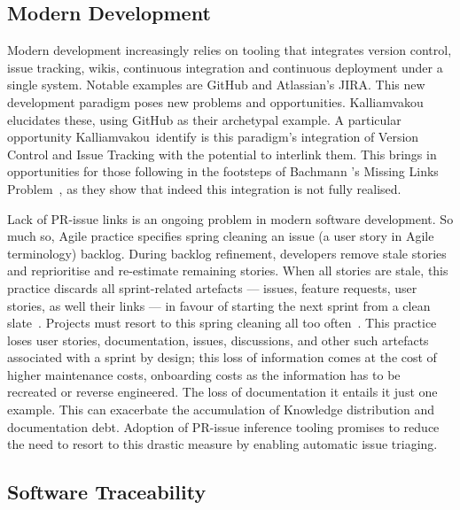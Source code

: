 \subsection{Modern Development}
\label{chapter:literature:sec:am_rel_work:modern_dev}

Modern development increasingly relies on tooling that integrates version
control, issue tracking, wikis, continuous integration and continuous deployment
under a single system. Notable examples are GitHub and Atlassian's JIRA. This
new development paradigm poses new problems and opportunities. Kalliamvakou
\etal~\cite{Kalliamvakou2014} elucidates these, using GitHub as their archetypal
example. A particular opportunity Kalliamvakou~\etal identify is this paradigm's
integration of Version Control and Issue Tracking with the potential to
interlink them. This brings in opportunities for those following in the
footsteps of Bachmann \etal's Missing Links Problem~\cite{MissingLinks}, as they
show that indeed this integration is not fully realised.

Lack of PR-issue links is an ongoing problem in modern software development.  So
much so, Agile practice specifies spring cleaning an issue (a user story in
Agile terminology) backlog. During backlog refinement, developers remove stale
stories and reprioritise and re-estimate remaining stories. When all stories are
stale, this practice discards all sprint-related artefacts --- issues, feature
requests, user stories, as well their links --- in favour of starting the next
sprint from a clean slate~\cite{BacklogRefinement}. Projects must resort to this
spring cleaning all too often~\cite{laurieTrattPersonalCommunciation}. This
practice loses user stories, documentation, issues, discussions, and other such
artefacts associated with a sprint by design; this loss of information comes at
the cost of higher maintenance costs, onboarding costs \etc as the information
has to be recreated or reverse engineered. The loss of documentation it entails
it just one example. This can exacerbate the accumulation of Knowledge
distribution and documentation debt. Adoption of PR-issue inference tooling
promises to reduce the need to resort to this drastic measure by enabling
automatic issue triaging.

\subsection{Software Traceability}
\label{chapter:literature:sec:am_rel_work:tracability}

